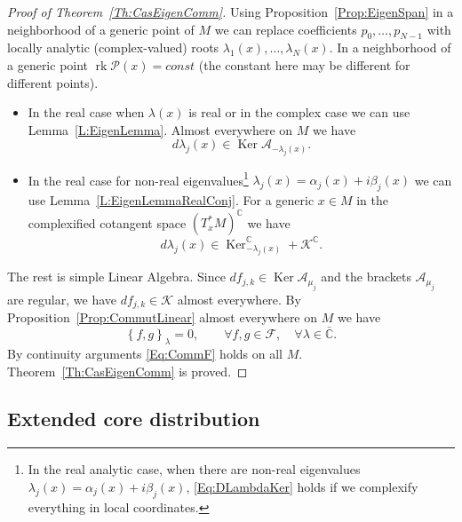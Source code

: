 \documentclass[12pt]{article}
\theoremstyle{definition}
\begin{document}
\begin{proof}[Proof of Theorem~\ref{Th:CasEigenComm}] Using Proposition~\ref{Prop:EigenSpan} in a neighborhood of a generic point of $M$ we can replace coefficients $p_0, \dots, p_{N-1}$ with locally analytic (complex-valued) roots $\lambda_1(x), \dots, \lambda_N(x)$.  In a neighborhood of a generic point $\operatorname{rk} \mathcal{P}(x) = const$ (the constant here may be different for different points). 

\begin{itemize}

    \item In the real case when $\lambda(x)$ is real or in the complex case we can use Lemma~\ref{L:EigenLemma}. Almost everywhere on $M$  we have \begin{equation} \label{Eq:DLambdaKer} d \lambda_j(x) \in \operatorname{Ker} \mathcal{A}_{-\lambda_j(x)}. \end{equation}

\item In the real case for non-real eigenvalues\footnote{In the real analytic case, when there are non-real eigenvalues $\lambda_j(x) = \alpha_j(x) + i \beta_j(x)$, \eqref{Eq:DLambdaKer} holds if we complexify everything in local coordinates. } $\lambda_j(x) = \alpha_j(x) + i \beta_j(x)$ we can use Lemma~\ref{L:EigenLemmaRealConj}. For a generic $x\in M$ in the complexified cotangent space $(T^*_xM)^{\mathbb{C}}$ we have \[d\lambda_j(x) \in \operatorname{Ker}_{-\lambda_j(x)}^{\mathbb{C}} + \mathcal{K}^{\mathbb{C}}.\]
    
\end{itemize}

 The rest is simple Linear Algebra. Since $df_{j,k} \in \operatorname{Ker} \mathcal{A}_{\mu_j}$ and the brackets $\mathcal{A}_{\mu_j}$ are regular, we have $df_{j,k} \in \mathcal{K}$ almost everywhere. By 
Proposition~\ref{Prop:CommutLinear} almost everywhere on $M$ we have \begin{equation} \label{Eq:CommF} \left\{ f, g\right\}_{\lambda} = 0, \qquad \forall f, g \in \mathcal{F}, \quad \forall \lambda \in \bar{\mathbb{C}}. \end{equation} By continuity arguments \eqref{Eq:CommF} holds on all $M$. Theorem~\ref{Th:CasEigenComm}  is proved. \end{proof}

\subsection{Extended core distribution}
\end{document}
